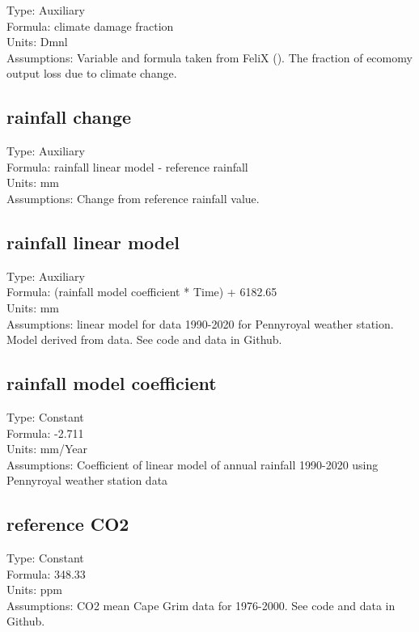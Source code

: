 \documentclass[
  11pt,
]{book}
\begin{document}
Type: Auxiliary\\
Formula: climate damage fraction\\
Units: Dmnl\\
Assumptions: Variable and formula taken from FeliX (\citet{rydzak_impact_2010}). The fraction of ecomomy output loss due to climate change.

\hypertarget{rainfall-change}{%
\subsection{rainfall change}\label{rainfall-change}}

Type: Auxiliary\\
Formula: rainfall linear model - reference rainfall\\
Units: mm\\
Assumptions: Change from reference rainfall value.

\hypertarget{rainfall-linear-model}{%
\subsection{rainfall linear model}\label{rainfall-linear-model}}

Type: Auxiliary\\
Formula: (rainfall model coefficient * Time) + 6182.65\\
Units: mm\\
Assumptions: linear model for data 1990-2020 for Pennyroyal weather station. Model derived from data. See code and data in Github.

\hypertarget{rainfall-model-coefficient}{%
\subsection{rainfall model coefficient}\label{rainfall-model-coefficient}}

Type: Constant\\
Formula: -2.711\\
Units: mm/Year\\
Assumptions: Coefficient of linear model of annual rainfall 1990-2020 using Pennyroyal weather station data

\hypertarget{reference-co2}{%
\subsection{reference CO2}\label{reference-co2}}

Type: Constant\\
Formula: 348.33\\
Units: ppm\\
Assumptions: CO2 mean Cape Grim data for 1976-2000. See code and data in Github.
\end{document}
